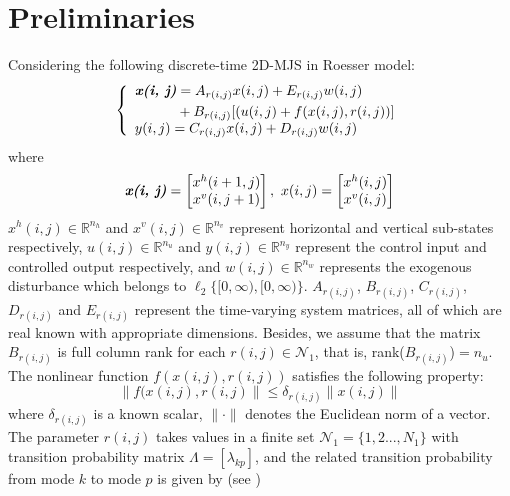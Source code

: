 \documentclass[journal,final,twocolumn]{IEEEtran}
\begin{document}
\section{Preliminaries} \label{priliminaries}
	Considering the following discrete-time 2D-MJS in Roesser model:
	\begin{equation} \label{system-equation}
	\left\{
		\begin{array}{lr}
			\begin{split}
				\emph{\textbf{x(i, j)}} &= A_{r(i,j)}x(i,j)+E_{r(i,j)}w(i,j)\\
										&+B_{r(i,j)}[(u(i,j)+f(x(i,j),r(i,j))]
			\end{split}\\
			\begin{split}
				y(i,j) = C_{r(i,j)}x(i,j)+D_{r(i,j)}w(i,j)
			\end{split}
		\end{array}
	\right.
	\end{equation}
	where
	\begin{equation*}
		\emph{\textbf{x(i, j)}} = \begin{bmatrix}
			x^{h}(i+1,j)\\
			x^{v}(i,j+1)
		\end{bmatrix}, \ 
		x(i, j) = \begin{bmatrix}
		x^{h}(i,j)\\
		x^{v}(i,j)
		\end{bmatrix}          
	\end{equation*}
	$x^{h}(i,j)\in \mathbb{R}^{n_h}$ and $x^{v}(i,j)\in \mathbb{R}^{n_v}$ represent horizontal and vertical sub-states respectively, $u(i,j) \in \mathbb{R}^{n_u}$ and $y(i,j) \in \mathbb{R}^{n_y}$ represent the control input and controlled output respectively, and $w(i,j) \in \mathbb{R}^{n_w}$ represents the exogenous disturbance which belongs to $\ell_{2}\{[0,\infty),[0,\infty)\}$. $A_{r(i,j)}$, $B_{r(i,j)}$, $C_{r(i,j)}$, $D_{r(i,j)}$ and $E_{r(i,j)}$ represent the time-varying system matrices, all of which are real known with appropriate dimensions. Besides, we assume that the matrix $B_{r(i,j)}$ is full column rank for each $r(i,j)\in\mathcal{N}_{1}$, that is, rank($B_{r(i,j)}$)$=n_u$. The nonlinear function $f(x(i,j),r(i,j))$ satisfies the following property:
	\begin{equation}\label{nonlinear-func}
		\|f(x(i,j),r(i,j)\| \leq \delta_{r(i,j)}\|x(i,j)\|
	\end{equation}
	where $\delta_{r(i,j)}$ is a known scalar, $\|\cdot\|$ denotes the Euclidean norm of a vector. The parameter $r(i,j)$ takes values in a finite set $\mathcal{N}_{1}=\{1,2...,N_{1} \}$ with transition probability matrix $\varLambda = [\lambda_{kp}]$, and the related transition probability from mode $k$ to mode $p$ is given by (see \cite{wu2018hcontrol2d,wu2008hfiltering2d})
\end{document}
